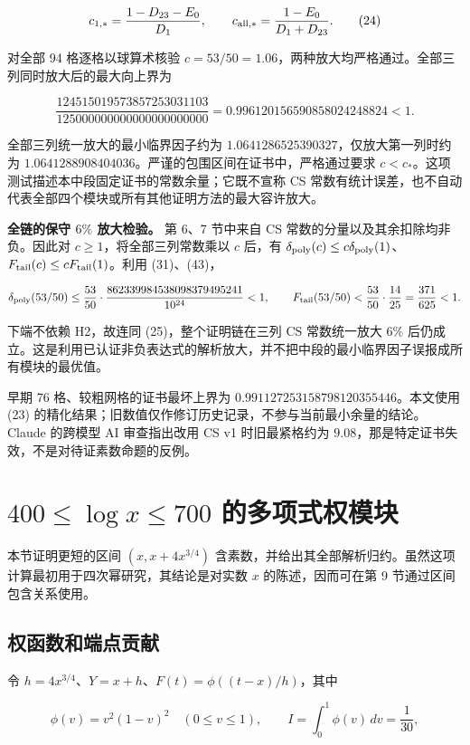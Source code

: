 \documentclass[UTF8,zihao=-4,fontset=fandol]{ctexart}
\begin{document}
\[
c_{1,*}=\frac{1-D_{23}-E_0}{D_1},\qquad
c_{{\rm all},*}=\frac{1-E_0}{D_1+D_{23}}. \tag{24}
\]

对全部 94 格逐格以球算术核验 \(c=53/50=1.06\)，两种放大均严格通过。全部三列同时放大后的最大向上界为

\[
\frac{124515019573857253031103}{125000000000000000000000}
=0.996120156590858024248824<1. \tag{25}
\]

全部三列统一放大的最小临界因子约为 \(1.0641286525390327\)，仅放大第一列时约为 \(1.0641288908404036\)。严谨的包围区间在证书中，严格通过要求 \(c<c_*\)。这项测试描述本中段固定证书的常数余量；它既不宣称 CS 常数有统计误差，也不自动代表全部四个模块或所有其他证明方法的最大容许放大。

\textbf{全链的保守 \(6\%\) 放大检验。} 第 6、7 节中来自 CS 常数的分量以及其余扣除均非负。因此对 \(c\ge1\)，将全部三列常数乘以 \(c\) 后，有 \(\delta_{\rm poly}(c)\le c\delta_{\rm poly}(1)\)、\(F_{\rm tail}(c)\le cF_{\rm tail}(1)\)。利用 (31)、(43)，

\[
\delta_{\rm poly}(53/50)
\le\frac{53}{50}\cdot
\frac{862339984538098379495241}{10^{24}}<1,
\qquad
F_{\rm tail}(53/50)<\frac{53}{50}\cdot\frac{14}{25}
=\frac{371}{625}<1.
\]

下端不依赖 H2，故连同 (25)，整个证明链在三列 CS 常数统一放大 \(6\%\) 后仍成立。这是利用已认证非负表达式的解析放大，并不把中段的最小临界因子误报成所有模块的最优值。

早期 76 格、较粗网格的证书最坏上界为 \(0.991127253158798120355446\)。本文使用 (23) 的精化结果；旧数值仅作修订历史记录，不参与当前最小余量的结论。Claude 的跨模型 AI 审查指出改用 CS v1 时旧最紧格约为 \(9.08\)，那是特定证书失效，不是对待证素数命题的反例。

\section{\(400\le\log x\le700\) 的多项式权模块}

本节证明更短的区间 \((x,x+4x^{3/4})\) 含素数，并给出其全部解析归约。虽然这项计算最初用于四次幂研究，其结论是对实数 \(x\) 的陈述，因而可在第 9 节通过区间包含关系使用。

\subsection{权函数和端点贡献}

令 \(h=4x^{3/4}\)、\(Y=x+h\)、\(F(t)=\phi((t-x)/h)\)，其中

\[
\phi(v)=v^2(1-v)^2\quad(0\le v\le1),\qquad
I=\int_0^1\phi(v)\,dv=\frac1{30},
\]
\end{document}
